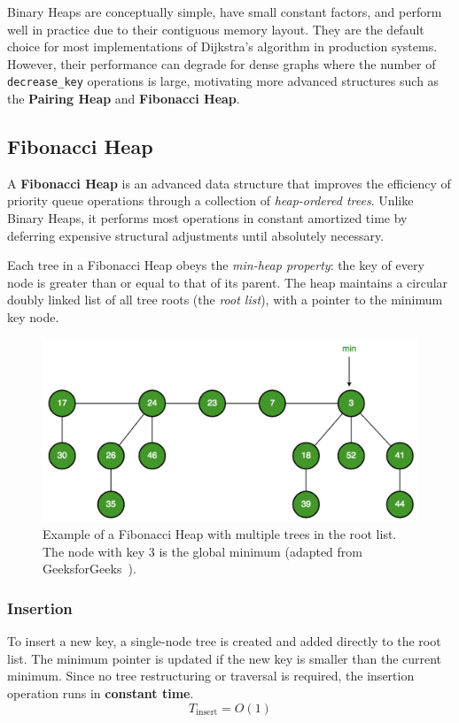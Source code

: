 \documentclass[acmsmall]{acmart}
\begin{document}
Binary Heaps are conceptually simple, have small constant factors, and perform well in practice due to their contiguous memory layout. They are the default choice for most implementations of Dijkstra’s algorithm in production systems. However, their performance can degrade for dense graphs where the number of \texttt{decrease\_key} operations is large, motivating more advanced structures such as the \textbf{Pairing Heap} and \textbf{Fibonacci Heap}.

\subsection{Fibonacci Heap}
A \textbf{Fibonacci Heap} is an advanced data structure that improves the efficiency of priority queue operations through a collection of \emph{heap-ordered trees}. Unlike Binary Heaps, it performs most operations in constant amortized time by deferring expensive structural adjustments until absolutely necessary.  

Each tree in a Fibonacci Heap obeys the \emph{min-heap property}: the key of every node is greater than or equal to that of its parent. The heap maintains a circular doubly linked list of all tree roots (the \emph{root list}), with a pointer to the minimum key node.

\begin{figure}[H]
  \centering
  \includegraphics[width=0.85\linewidth]{figs/fibonacci_heap.png}
  \caption{Example of a Fibonacci Heap with multiple trees in the root list. The node with key 3 is the global minimum (adapted from GeeksforGeeks~\cite{geeksforgeeks_fibonacciheap}).}
  \label{fig:fibonacciheap}
\end{figure}

\subsubsection*{Insertion}
To insert a new key, a single-node tree is created and added directly to the root list. The minimum pointer is updated if the new key is smaller than the current minimum.  
Since no tree restructuring or traversal is required, the insertion operation runs in \textbf{constant time}.  
\[
T_{\text{insert}} = O(1)
\]
\end{document}
